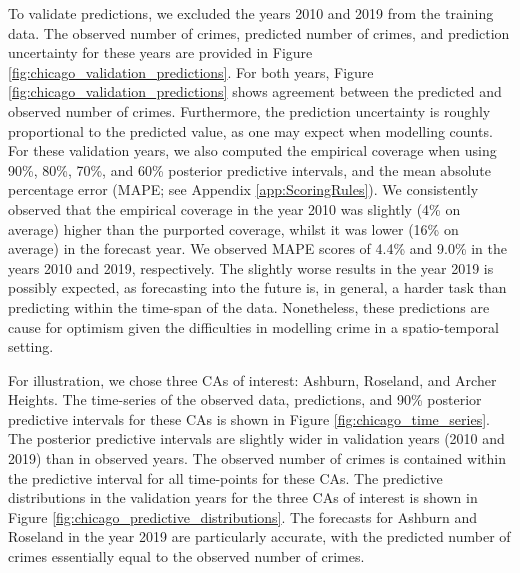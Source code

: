 \documentclass[article]{jss}
\begin{document}
To validate predictions, we excluded the years 2010 and 2019 from the training data. 
The observed number of crimes, predicted number of crimes, and prediction uncertainty for these years are provided in Figure \ref{fig:chicago_validation_predictions}. 
For both years, Figure \ref{fig:chicago_validation_predictions} shows agreement between the predicted and observed number of crimes. Furthermore, 
 the prediction uncertainty is roughly proportional to the predicted value, as one may expect when modelling counts.
For these validation years, we also computed the empirical coverage when using 90\%, 80\%, 70\%, and 60\% posterior predictive intervals, and the mean absolute percentage error (MAPE; see Appendix \ref{app:ScoringRules}). 
We consistently observed that the empirical coverage in the year 2010 was slightly (4\% on average) higher than the purported coverage, whilst it was lower (16\% on average) in the forecast year.
We observed MAPE scores of 4.4\% and 9.0\% in the years 2010 and 2019, respectively.
The slightly worse results in the year 2019 is possibly expected, as forecasting into the future is, in general, a harder task than predicting within the time-span of the data.
Nonetheless, these predictions are cause for optimism given the difficulties in modelling crime in a spatio-temporal setting. 


For illustration, we chose three CAs of interest: 
Ashburn, %
Roseland, %
and Archer Heights. %
The time-series of the observed data, predictions, and 90\% posterior predictive intervals for these CAs is shown in Figure \ref{fig:chicago_time_series}. 
The posterior predictive intervals are slightly wider in validation years (2010 and 2019) than in observed years. 
 The observed number of crimes is contained within the predictive interval for all time-points for these CAs.
The predictive distributions in the validation years for the three CAs of interest is shown in Figure \ref{fig:chicago_predictive_distributions}.
The forecasts for Ashburn and Roseland in the year 2019 are particularly accurate, with the predicted number of crimes essentially equal to the observed number of crimes. 
\end{document}
